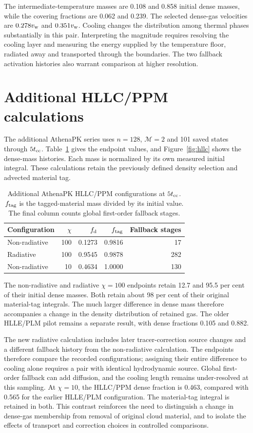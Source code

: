 \documentclass[twocolumn,apj,numberedappendix]{openjournal}
\begin{document}
The intermediate-temperature masses are 0.108 and 0.858 initial dense masses, while the covering fractions are 0.062 and 0.239. The selected dense-gas velocities are $0.278v_{\rm w}$ and $0.351v_{\rm w}$. Cooling changes the distribution among thermal phases substantially in this pair. Interpreting the magnitude requires resolving the cooling layer and measuring the energy supplied by the temperature floor, radiated away and transported through the boundaries. The two fallback activation histories also warrant comparison at higher resolution.
\section{Additional HLLC/PPM calculations}\label{app:hllc}
The additional AthenaPK series uses $n=128$, $\mathcal M=2$ and 101 saved states through $5t_{\rm cc}$. Table~\ref{tab:hllc} gives the endpoint values, and Figure~\ref{fig:hllc} shows the dense-mass histories. Each mass is normalized by its own measured initial integral. These calculations retain the previously defined density selection and advected material tag.

\begin{table}[tb]
\centering
\caption{Additional AthenaPK HLLC/PPM configurations at $5t_{\rm cc}$. $f_{\rm tag}$ is the tagged-material mass divided by its initial value. The final column counts global first-order fallback stages.}
\label{tab:hllc}
\begin{tabular}{lrrrr}
\toprule
Configuration & $\chi$ & $f_{\rm d}$ & $f_{\rm tag}$ & Fallback stages\\
\midrule
Non-radiative & 100 & 0.1273 & 0.9816 & 17\\
Radiative & 100 & 0.9545 & 0.9878 & 282\\
Non-radiative & 10 & 0.4634 & 1.0000 & 130\\
\bottomrule
\end{tabular}
\end{table}

The non-radiative and radiative $\chi=100$ endpoints retain 12.7 and 95.5 per cent of their initial dense masses. Both retain about 98 per cent of their original material-tag integrals. The much larger difference in dense mass therefore accompanies a change in the density distribution of retained gas. The older HLLE/PLM pilot remains a separate result, with dense fractions 0.105 and 0.882.

The new radiative calculation includes later tracer-correction source changes and a different fallback history from the non-radiative calculation. The endpoints therefore compare the recorded configurations; assigning their entire difference to cooling alone requires a pair with identical hydrodynamic source. Global first-order fallback can add diffusion, and the cooling length remains under-resolved at this sampling.
At $\chi=10$, the HLLC/PPM dense fraction is 0.463, compared with 0.565 for the earlier HLLE/PLM configuration. The material-tag integral is retained in both. This contrast reinforces the need to distinguish a change in dense-gas membership from removal of original cloud material, and to isolate the effects of transport and correction choices in controlled comparisons.
\end{document}
